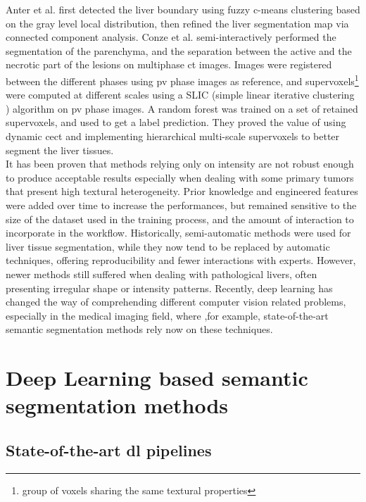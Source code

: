 Anter et al. \cite{Anter2014} first detected the liver boundary using fuzzy c-means
clustering based on the gray level local distribution, then refined the
liver segmentation map via connected component analysis. Conze et al. \cite{Conze2017} semi-interactively performed 
the segmentation of the parenchyma, and the separation between 
the active and the necrotic part of the lesions on multiphase \ac{ct} images.
Images were registered between the different phases using \ac{pv} phase images as reference, and
supervoxels\footnote{group of voxels sharing the same textural properties}
were computed at different scales using a SLIC (simple linear iterative clustering ) 
algorithm on \ac{pv} phase images. A random forest was trained 
on a set of retained supervoxels, and used to get a label prediction. 
They proved the value of using dynamic \ac{cect} and implementing 
hierarchical multi-scale supervoxels to better segment the liver tissues.\\
It has been proven that methods relying only on intensity are not robust
enough to produce acceptable results especially when dealing with some
primary tumors that present high textural heterogeneity. Prior knowledge
and engineered features were added over time to increase the
performances, but remained sensitive to the size of the dataset used in
the training process, and the amount of interaction to incorporate in
the workflow.
Historically, semi-automatic methods were used for liver tissue
segmentation, while they now tend to be replaced by automatic
techniques, offering reproducibility and fewer interactions with
experts. However, newer methods still suffered when dealing with
pathological livers, often presenting irregular shape or intensity
patterns.
Recently, deep learning has changed the way of comprehending different
computer vision related problems, especially in the medical imaging
field, where ,for example, state-of-the-art semantic segmentation 
methods rely now on these techniques.


\section{Deep Learning based semantic segmentation methods}

\subsection{State-of-the-art \ac{dl} pipelines} \label{subsection:StateOfTheArtDlImplementations}

